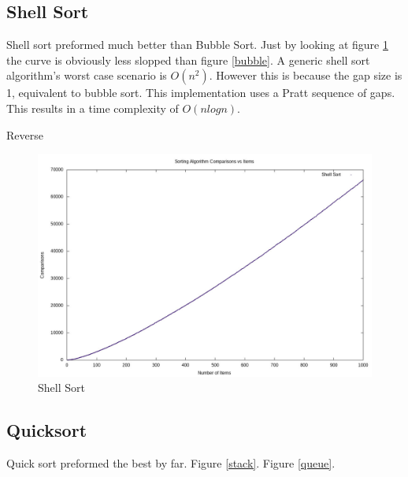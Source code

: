 \documentclass[12pt]{article}
\begin{document}

	\subsection{Shell Sort}

	Shell sort preformed much better than Bubble Sort.
	Just by looking at figure \ref{shell} the curve is obviously less slopped than figure \ref{bubble}.
	A generic shell sort algorithm's worst case scenario is $O(n^2)$.
	However this is because the gap size is 1, equivalent to bubble sort.
	This implementation uses a Pratt sequence of gaps.
	This results in a time complexity of $O(n log n)$.

	Reverse

	\begin{figure}[H]
		\caption{Shell Sort}\label{shell}
		\includegraphics[width=6in]{shell}
		\centering
	\end{figure}


	\subsection{Quicksort}

	Quick sort preformed the best by far. Figure \ref{stack}. Figure \ref{queue}.
\end{document}
